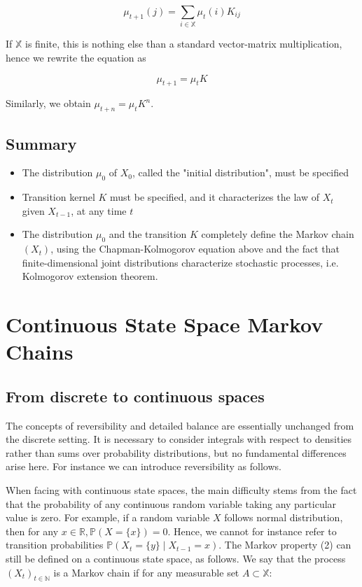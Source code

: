 \documentclass[10pt]{article}
\begin{document}
$$
\mu_{t+1}(j)=\sum_{i \in \mathbb{X}} \mu_{t}(i) K_{i j}
$$

If $\mathbb{X}$ is finite, this is nothing else than a standard vector-matrix multiplication, hence we rewrite the equation as

$$
\mu_{t+1}=\mu_{t} K
$$

Similarly, we obtain $\mu_{t+n}=\mu_{t} K^{n}$.

\subsection{Summary}
\begin{itemize}
    \item The distribution $\mu_{0}$ of $X_{0}$, called the "initial distribution", must be specified
    \item Transition kernel $K$ must be specified, and it characterizes the law of $X_{t}$ given $X_{t-1}$, at any time $t$
    \item The distribution $\mu_{0}$ and the transition $K$ completely define the Markov chain $\left(X_{t}\right)$, using the Chapman-Kolmogorov equation above and the fact that finite-dimensional joint distributions characterize stochastic processes, i.e. Kolmogorov extension theorem.
\end{itemize}

\section{Continuous State Space Markov Chains}
\subsection{From discrete to continuous spaces}
The concepts of reversibility and detailed balance are essentially unchanged from the discrete setting. It is necessary to consider integrals with respect to densities rather than sums over probability distributions, but no fundamental differences arise here. For instance we can introduce reversibility as follows.


When facing with continuous state spaces, the main difficulty stems from the fact that the probability of any continuous random variable taking any particular value is zero. For example, if a random variable $X$ follows normal distribution, then for any $x \in \mathbb{R}, \mathbb{P}(X=\{x\})=0$. Hence, we cannot for instance refer to transition probabilities $\mathbb{P}\left(X_{t}=\{y\} \mid X_{t-1}=x\right)$. The Markov property (2) can still be defined on a continuous state space, as follows. We say that the process $\left(X_{t}\right)_{t \in \mathbb{N}}$ is a Markov chain if for any measurable set $A \subset \mathbb{X}:$
\end{document}
